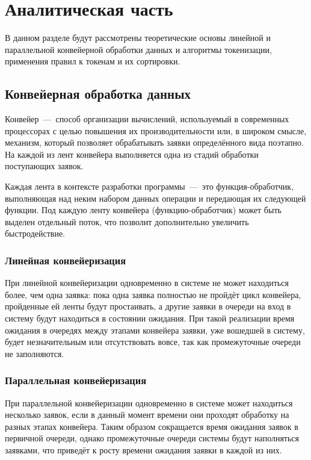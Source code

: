 \chapter{Аналитическая часть}
В данном разделе будут рассмотрены теоретические основы линейной и параллельной конвейерной обработки данных и алгоритмы токенизации, применения правил к токенам и их сортировки.

\section{Конвейерная обработка данных}
Конвейер~---~способ организации вычислений, используемый в современных процессорах с целью повышения их производительности или, в широком смысле, механизм, который позволяет обрабатывать заявки определённого вида поэтапно. На каждой из лент конвейера выполняется одна из стадий обработки поступающих заявок. 

Каждая лента в контексте разработки программы~---~это функция-обработчик, выполняющая над неким набором данных операции и передающая их следующей функции. Под каждую ленту конвейера (функцию-обработчик) может быть выделен отдельный поток, что позволит дополнительно увеличить быстродействие.

\subsection{Линейная конвейеризация}
При линейной конвейеризации одновременно в системе не может находиться более, чем одна заявка: пока одна заявка полностью не пройдёт цикл конвейера, пройденные ей ленты будут простаивать, а другие заявки в очереди на вход в систему будут находиться в состоянии ожидания. При такой реализации время ожидания в очередях между этапами конвейера заявки, уже вошедшей в систему, будет незначительным или отсутствовать вовсе, так как промежуточные очереди не заполняются.

\subsection{Параллельная конвейеризация}
При параллельной конвейеризации одновременно в системе может находиться несколько заявок, если в данный момент времени они проходят обработку на разных этапах конвейера. Таким образом сокращается время ожидания заявок в первичной очереди, однако промежуточные очереди системы будут наполняться заявками, что приведёт к росту времени ожидания заявки в каждой из них.

